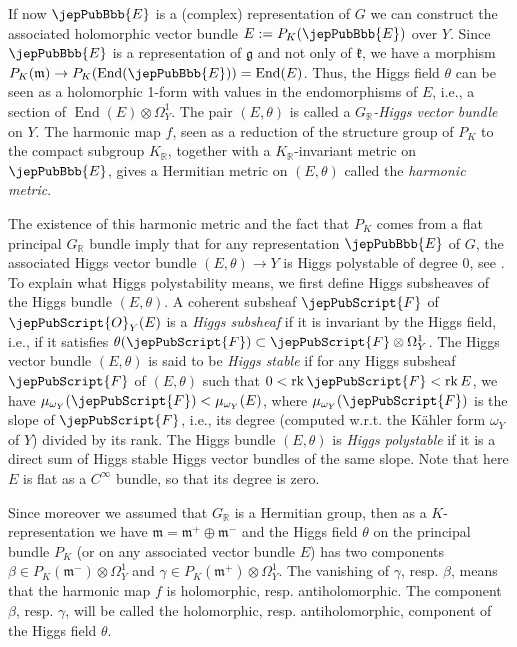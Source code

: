 If now $\jepPubBbb{E}$ is a (complex) representation of $G$ we can construct the associated holomorphic vector bundle $E:=P_K(\jepPubBbb{E})$ over $Y$. Since $\jepPubBbb{E}$ is a representation of $\mathfrak g$ and not only of $\mathfrak k$, we have a morphism $P_K(\mathfrak m)\to P_K(\operatorname{End}(\jepPubBbb{E}))=\operatorname{End}(E)$. Thus, the Higgs field $\theta$ can be seen as a holomorphic 1-form with values in the endomorphisms of $E$, i.e., a section of $\operatorname{End}(E)\otimes\Omega_Y^1$. The pair $(E,\theta)$ is called a \emph{$G_{\mathbb R}$-Higgs vector bundle} on $Y$. The harmonic map $f$, seen as a reduction of the structure group of $P_K$ to the compact subgroup $K_{\mathbb R}$, together with a $K_{\mathbb R}$-invariant metric on $\jepPubBbb{E}$, gives a Hermitian metric on $(E,\theta)$ called the \emph{harmonic metric}.

The existence of this harmonic metric and the fact that $P_K$ comes from a flat principal $G_{\mathbb R}$ bundle imply that for any representation $\jepPubBbb{E}$ of $G$, the associated Higgs vector bundle $(E,\theta)\to Y$ is Higgs polystable of degree 0, see \cite{jep93Sim88}. To explain what Higgs polystability means, we first define Higgs subsheaves of the Higgs bundle $(E,\theta)$. A coherent subsheaf $\jepPubScript{F}$ of $\jepPubScript{O}_Y(E)$ is a \emph{Higgs subsheaf} if it is invariant by the Higgs field, i.e., if it satisfies $\theta(\jepPubScript{F})\subset\jepPubScript{F}\otimes\Omega_Y^1$. The Higgs vector bundle $(E,\theta)$ is said to be \emph{Higgs stable} if for any Higgs subsheaf $\jepPubScript{F}$ of $(E,\theta)$ such that $0<\operatorname{rk}\jepPubScript{F}<\operatorname{rk}E$, we have $\mu_{\omega_Y}(\jepPubScript{F})<\mu_{\omega_Y}(E)$, where $\mu_{\omega_Y}(\jepPubScript{F})$ is the slope of $\jepPubScript{F}$, i.e., its degree (computed w.r.t. the Kähler form $\omega_Y$ of $Y$) divided by its rank. The Higgs bundle $(E,\theta)$ is \emph{Higgs polystable} if it is a direct sum of Higgs stable Higgs vector bundles of the same slope. Note that here $E$ is flat as a $C^{\infty}$ bundle, so that its degree is zero.
\begin{remark}
Since moreover we assumed that $G_{\mathbb R}$ is a Hermitian group, then as a $K$-representation we have $\mathfrak m=\mathfrak m^+\oplus\mathfrak m^-$ and the Higgs field $\theta$ on the principal bundle $P_K$ (or on any associated vector bundle $E$) has two components $\beta\in P_K(\mathfrak m^-)\otimes\Omega_Y^1$ and $\gamma\in P_K(\mathfrak m^+)\otimes\Omega_Y^1$. The vanishing of $\gamma$, resp. $\beta$, means that the harmonic map $f$ is holomorphic, resp. antiholomorphic. The component $\beta$, resp. $\gamma$, will be called the holomorphic, resp. antiholomorphic, component of the Higgs field $\theta$.
\end{remark}
